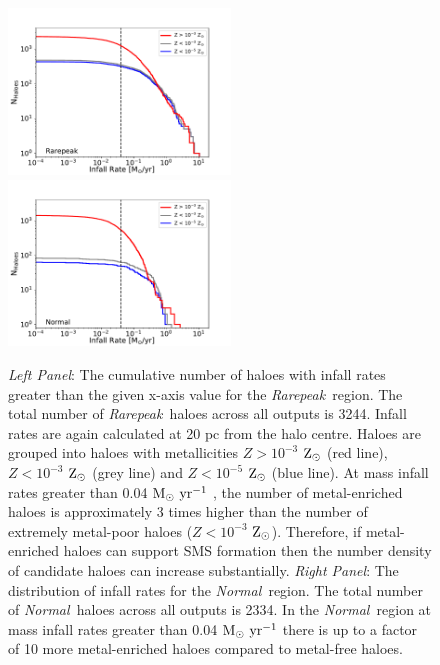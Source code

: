 \documentclass[graphics, twocolumn, usenatbib]{mn2e}
\newcommand{\msolaryr} {$\rm{M_{\odot}~yr^{-1}}~$}
\newcommand{\zsolar} {$\rm{Z_{\odot}}~$}
\newcommand{\zsolarc} {$\rm{Z_{\odot}}$}
\newcommand{\rarepeak} {\textit{Rarepeak~}}
\newcommand{\normal} {\textit{Normal~}}
\begin{document}
\begin{figure}
\centering
\begin{minipage}{175mm}      \begin{center} 
\centerline{
\includegraphics[width=0.525\textwidth]{FIGURES/Rarepeak_NHaloes.pdf}
\includegraphics[width=0.525\textwidth]{FIGURES/Normal_NHaloes.pdf}}
\caption{\textit{Left Panel}: The cumulative number of haloes with infall rates greater than the given
  x-axis value for the \rarepeak region.  The total number of \rarepeak haloes across all outputs
  is 3244. Infall rates are again calculated at 20 pc from the halo centre.
  Haloes are grouped into haloes with metallicities $Z> 10^{-3}$ \zsolar (red line),
  $Z< 10^{-3}$ \zsolar (grey line) and  $Z< 10^{-5}$ \zsolar (blue line). At mass infall
  rates greater than 0.04 \msolaryr, the number of metal-enriched haloes is approximately 3 times
  higher than the number of extremely
  metal-poor haloes ($Z< 10^{-3}$ \zsolarc). Therefore, if metal-enriched haloes can support SMS
  formation then the number density of candidate haloes can increase substantially. 
  \textit{Right Panel}: The distribution of
  infall rates for the \normal region. The  total number of \normal haloes across all outputs is 2334.
  In the \normal region at mass infall
  rates greater than 0.04 \msolaryr there is up to a factor of 10 more metal-enriched haloes compared to
  metal-free haloes. 
 } \label{Fig:Histogram}
\end{center} \end{minipage}

\end{figure}
\end{document}
